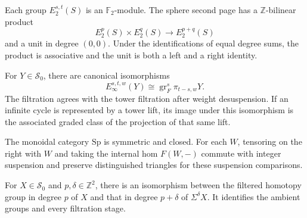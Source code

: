 \begin{definition}
\label{frontier:AdamsSynthetic:f05463b82afe}
Each group $E_2^{s,t}(S)$ is an $\mathbb F_2$-module. The sphere second page has a $\mathbb Z$-bilinear product
\[
E_2^p(S)\times E_2^q(S)\longrightarrow E_2^{p+q}(S)
\]
and a unit in degree $(0,0)$. Under the identifications of equal degree sums, the product is associative and the unit is both a left and a right identity.
\end{definition}

\begin{definition}
\label{frontier:AdamsSynthetic:f083536a377e}
For $Y\in\mathcal S_0$, there are canonical isomorphisms
\[
E_\infty^{s,t,w}(Y)\cong\operatorname{gr}_F^s\pi_{t-s,w}Y.
\]
The filtration agrees with the tower filtration after weight desuspension. If an infinite cycle is represented by a tower lift, its image under this isomorphism is the associated graded class of the projection of that same lift.
\end{definition}

\begin{definition}
\label{frontier:AdamsSynthetic:6a2402d27721}
The monoidal category $\mathrm{Sp}$ is symmetric and closed. For each $W$, tensoring on the right with $W$ and taking the internal hom $F(W,-)$ commute with integer suspension and preserve distinguished triangles for these suspension comparisons.
\end{definition}











\begin{definition}
\label{frontier:AdamsSynthetic:63b3daf63e20}
For $X\in\mathcal S_0$ and $p,\delta\in\mathbb Z^2$, there is an isomorphism between the filtered homotopy group in degree $p$ of $X$ and that in degree $p+\delta$ of $\Sigma^\delta X$. It identifies the ambient groups and every filtration stage.
\end{definition}







